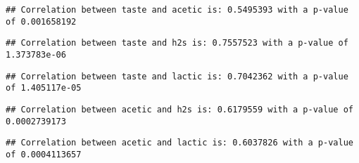 \documentclass[]{article}
\newenvironment{Shaded}{\begin{snugshade}}{\end{snugshade}}
\newcommand{\CharTok}[1]{\textcolor[rgb]{0.31,0.60,0.02}{#1}}
\newcommand{\ControlFlowTok}[1]{\textcolor[rgb]{0.13,0.29,0.53}{\textbf{#1}}}
\newcommand{\DataTypeTok}[1]{\textcolor[rgb]{0.13,0.29,0.53}{#1}}
\newcommand{\KeywordTok}[1]{\textcolor[rgb]{0.13,0.29,0.53}{\textbf{#1}}}
\newcommand{\NormalTok}[1]{#1}
\newcommand{\OperatorTok}[1]{\textcolor[rgb]{0.81,0.36,0.00}{\textbf{#1}}}
\newcommand{\StringTok}[1]{\textcolor[rgb]{0.31,0.60,0.02}{#1}}
\begin{document}
\begin{Shaded}
\end{Shaded}

\begin{verbatim}
## Correlation between taste and acetic is: 0.5495393 with a p-value of 0.001658192
\end{verbatim}

\begin{verbatim}
## Correlation between taste and h2s is: 0.7557523 with a p-value of 1.373783e-06
\end{verbatim}

\begin{verbatim}
## Correlation between taste and lactic is: 0.7042362 with a p-value of 1.405117e-05
\end{verbatim}

\begin{verbatim}
## Correlation between acetic and h2s is: 0.6179559 with a p-value of 0.0002739173
\end{verbatim}

\begin{verbatim}
## Correlation between acetic and lactic is: 0.6037826 with a p-value of 0.0004113657
\end{verbatim}
\end{document}
